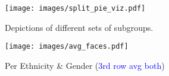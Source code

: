 
    \begin{subfigure}[b]
	\centering    
	\texttt{[image: images/split\_pie\_viz.pdf]}
		\caption{Depictions of different sets of subgroups.} \label{fig:splitpies} 
		 \end{subfigure}
     \begin{subfigure}[b]
     \centering
        \texttt{[image: images/avg\_faces.pdf]}
         \caption{Per Ethnicity \& Gender (\textcolor{blue}{3rd row avg both})}
         \label{fig:avgs}
    \end{subfigure}
    


